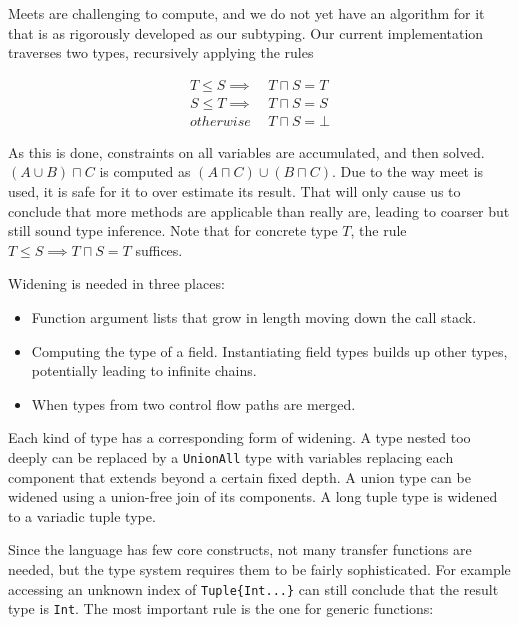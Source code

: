 Meets are challenging to compute, and we do not yet have an algorithm for
it that is as rigorously developed as our subtyping.
Our current implementation traverses two types, recursively applying the
rules

\vspace{-3ex}
\begin{singlespace}
\begin{align*}
T\leq S  \implies &\ T\sqcap S = T \\
S\leq T  \implies &\ T\sqcap S = S \\
         otherwise\ &\ T\sqcap S = \bot
\end{align*}
\end{singlespace}

\noindent
As this is done, constraints on all variables are accumulated, and then
solved.
$(A\cup B)\sqcap C$ is computed as $(A\sqcap C) \cup (B\sqcap C)$.
Due to the way meet is used, it is safe for it to over estimate its
result.
That will only cause us to conclude that more methods are applicable
than really are, leading to coarser but still sound type inference.
Note that for concrete type $T$, the rule
$T\leq S \implies T\sqcap S = T$ suffices.

Widening is needed in three places:

\begin{itemize}
\item Function argument lists that grow in length moving down the call stack.
\item Computing the type of a field. Instantiating field types builds up
other types, potentially leading to infinite chains.
\item When types from two control flow paths are merged.
\end{itemize}

\noindent
Each kind of type has a corresponding form of widening.
A type nested too deeply can be replaced by a \texttt{UnionAll} type
with variables replacing each component that extends beyond a certain
fixed depth.
A union type can be widened using a union-free join of its components.
A long tuple type is widened to a variadic tuple type.

Since the language has few core constructs, not many transfer functions
are needed, but the type system requires them to be fairly sophisticated.
For example accessing an unknown index of \texttt{Tuple\{Int...\}} can
still conclude that the result type is \texttt{Int}.
The most important rule is the one for generic functions:

